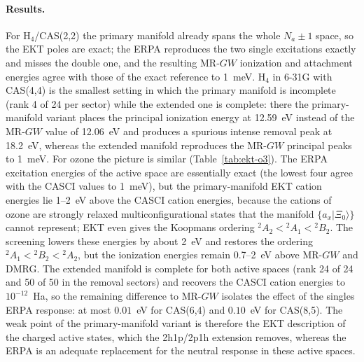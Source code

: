 \documentclass[11pt,a4paper]{article}
\newcommand{\ket}[1]{|#1\rangle}
\newcommand{\MRGW}{MR-$GW$}
\begin{document}
\paragraph{Results.}
For H$_4$/CAS(2,2) the primary manifold already spans the whole $N_a\pm1$
space, so the EKT poles are exact; the ERPA reproduces the two single
excitations exactly and misses the double one, and the resulting \MRGW{}
ionization and attachment energies agree with those of the exact reference
to 1~meV.  H$_4$ in 6-31G with CAS(4,4) is the smallest setting in which
the primary manifold is incomplete (rank 4 of 24 per sector) while the
extended one is complete: there the primary-manifold variant places the
principal ionization energy at 12.59~eV instead of the \MRGW{} value of
12.06~eV and produces a spurious intense removal peak at 18.2~eV, whereas
the extended manifold reproduces the \MRGW{} principal peaks to 1~meV.  For
ozone the picture is similar (Table~\ref{tab:ekt-o3}).
The ERPA excitation energies of the active space are essentially exact (the
lowest four agree with the CASCI values to 1~meV), but the primary-manifold
EKT cation energies lie 1--2~eV above the CASCI cation energies, because
the cations of ozone are strongly relaxed multiconfigurational states that
the manifold $\{a_x\ket{\Xi_0}\}$ cannot represent; EKT even gives the
Koopmans ordering $^2A_2<{}^2A_1<{}^2B_2$.  The screening lowers these
energies by about 2~eV and restores the ordering $^2A_1<{}^2B_2<{}^2A_2$,
but the ionization energies remain 0.7--2~eV above \MRGW{} and DMRG.  The
extended manifold is complete for both active spaces (rank 24 of 24 and 50
of 50 in the removal sectors) and recovers the CASCI cation energies to
$10^{-12}$~Ha, so the remaining difference to \MRGW{} isolates the effect of
the singles ERPA response: at most $0.01$~eV for CAS(6,4) and $0.10$~eV for
CAS(8,5).  The weak point of the primary-manifold variant is therefore the
EKT description of the charged active states, which the 2h1p/2p1h
extension removes, whereas the ERPA is an adequate replacement for the
neutral response in these active spaces.
\end{document}
